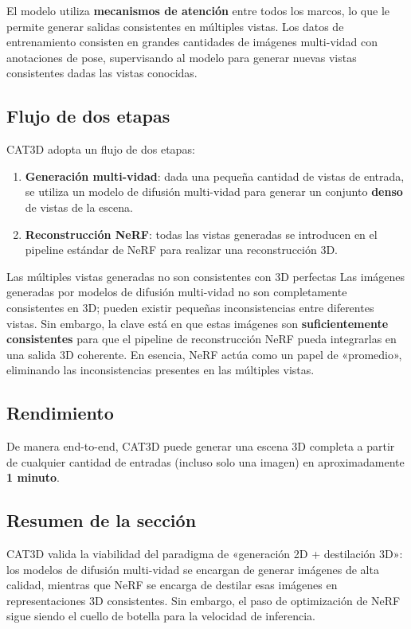 El modelo utiliza \textbf{mecanismos de atención} entre todos los marcos, lo que le permite generar salidas consistentes en múltiples vistas. Los datos de entrenamiento consisten en grandes cantidades de imágenes multi-vidad con anotaciones de pose, supervisando al modelo para generar nuevas vistas consistentes dadas las vistas conocidas.

\subsection{Flujo de dos etapas}

CAT3D adopta un flujo de dos etapas:

\begin{enumerate}
    \item \textbf{Generación multi-vidad}: dada una pequeña cantidad de vistas de entrada, se utiliza un modelo de difusión multi-vidad para generar un conjunto \textbf{denso} de vistas de la escena.
    \item \textbf{Reconstrucción NeRF}: todas las vistas generadas se introducen en el pipeline estándar de NeRF para realizar una reconstrucción 3D.
\end{enumerate}

\begin{warningbox}{Las múltiples vistas generadas no son consistentes con 3D perfectas}
Las imágenes generadas por modelos de difusión multi-vidad no son completamente consistentes en 3D; pueden existir pequeñas inconsistencias entre diferentes vistas. Sin embargo, la clave está en que estas imágenes son \textbf{suficientemente consistentes} para que el pipeline de reconstrucción NeRF pueda integrarlas en una salida 3D coherente. En esencia, NeRF actúa como un papel de «promedio», eliminando las inconsistencias presentes en las múltiples vistas.
\end{warningbox}

\subsection{Rendimiento}

De manera end-to-end, CAT3D puede generar una escena 3D completa a partir de cualquier cantidad de entradas (incluso solo una imagen) en aproximadamente \textbf{1 minuto}.

\subsection{Resumen de la sección}

CAT3D valida la viabilidad del paradigma de «generación 2D + destilación 3D»: los modelos de difusión multi-vidad se encargan de generar imágenes de alta calidad, mientras que NeRF se encarga de destilar esas imágenes en representaciones 3D consistentes. Sin embargo, el paso de optimización de NeRF sigue siendo el cuello de botella para la velocidad de inferencia.

